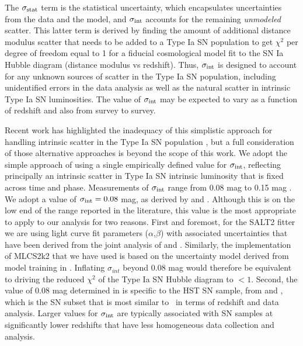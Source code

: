 \noindent
The $\sigma_{\rm stat}$ term is the statistical uncertainty, which
encapsulates uncertainties from the data and the model, and
$\sigma_{\rm int}$ accounts for the remaining {\it unmodeled} scatter.
This latter term is derived by finding the amount of additional
distance modulus scatter that needs to be added to a Type Ia SN
population to get $\chi^2$ per degree of freedom equal to 1 for a
fiducial cosmological model fit to the SN Ia Hubble diagram (distance
modulus vs redshift).  Thus, $\sigma_{\rm int}$ is designed to account
for any unknown sources of scatter in the Type Ia SN population,
including unidentified errors in the data analysis as well as the
natural scatter in intrinsic Type Ia SN luminosities.  The value of
$\sigma_{\rm int}$ may be expected to vary as a function of redshift
and also from survey to survey.

Recent work has highlighted the inadequacy of this simplistic approach
for handling intrinsic scatter in the Type Ia SN
population \citep{Marriner:2011,Kessler:2013,Mosher:2014,Scolnic:2014a,Betoule:2014},
but a full consideration of those alternative approaches is beyond the
scope of this work.  We adopt the simple approach of using a single
empirically defined value for $\sigma_{\rm int}$, reflecting
principally an intrinsic scatter in Type Ia SN intrinsic luminosity
that is fixed across time and phase.  Measurements of $\sigma_{\rm
int}$ range from 0.08 mag \citep{Jha:2007,Conley:2011} to 0.15
mag \citep{Kessler:2009b,Suzuki:2012}.  We adopt a value of
$\sigma_{\rm int}=0.08$ mag, as derived by \citet{Jha:2007}
and \citet{Conley:2011}.  Although this is on the low end of the range
reported in the literature, this value is the most appropriate to
apply to our analysis for two reasons.  First and foremost, for the
SALT2 fitter we are using light curve fit parameters
($\alpha$,$\beta$) with associated uncertainties that have been
derived from the joint analysis of \citet{Conley:2011}
and \citet{Sullivan:2011}. Similarly, the implementation of MLCS2k2
that we have used is based on the uncertainty model derived from model
training in \citet{Jha:2007}.  Inflating $\sigma_{int}$ beyond 0.08
mag would therefore be equivalent to driving the reduced $\chi^2$ of
the Type Ia SN Hubble diagram to $<1$.  Second, the value of 0.08 mag
determined in \citet{Conley:2011} is specific to the HST SN sample,
from \citet{Riess:2007} and \citet{Suzuki:2012}, which is the SN
subset that is most similar to \tomas\ in terms of redshift and data
analysis.  Larger values for $\sigma_{\rm int}$ are typically
associated with SN samples at significantly lower redshifts that have
less homogeneous data collection and analysis. 

